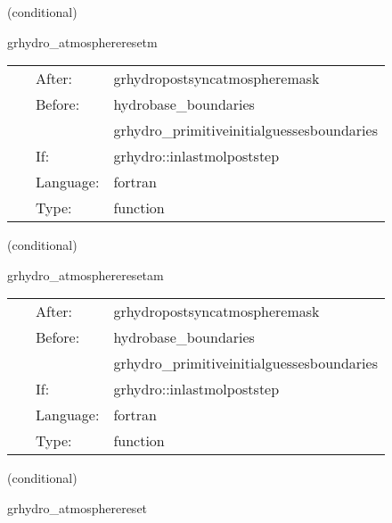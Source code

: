    (conditional) 

\hspace{5mm} grhydro\_atmosphereresetm 

\hspace{5mm}{\it reset the atmosphere - mhd version } 


\hspace{5mm}

 \begin{tabular*}{160mm}{cll} 
~ & After:  & grhydropostsyncatmospheremask \\ 
~ & Before:  & hydrobase\_boundaries \\ 
~& ~ &grhydro\_primitiveinitialguessesboundaries\\ 
~ & If:  & grhydro::inlastmolpoststep \\ 
~ & Language:  & fortran \\ 
~ & Type:  & function \\ 
\end{tabular*} 


\vspace{5mm}

   (conditional) 

\hspace{5mm} grhydro\_atmosphereresetam 

\hspace{5mm}{\it reset the atmosphere - mhd with avec version } 


\hspace{5mm}

 \begin{tabular*}{160mm}{cll} 
~ & After:  & grhydropostsyncatmospheremask \\ 
~ & Before:  & hydrobase\_boundaries \\ 
~& ~ &grhydro\_primitiveinitialguessesboundaries\\ 
~ & If:  & grhydro::inlastmolpoststep \\ 
~ & Language:  & fortran \\ 
~ & Type:  & function \\ 
\end{tabular*} 


\vspace{5mm}

   (conditional) 

\hspace{5mm} grhydro\_atmospherereset 

\hspace{5mm}{\it reset the atmosphere } 


